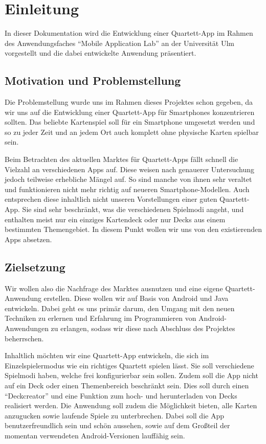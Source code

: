 \chapter{Einleitung}
\label{cha:einleitung}

In dieser Dokumentation wird die Entwicklung einer Quartett-App im Rahmen des Anwendungsfaches ``Mobile Application Lab'' an der Universität Ulm vorgestellt und die dabei entwickelte Anwendung präsentiert.

\section{Motivation und Problemstellung}
\label{sec:einleitung:problemstellung}

Die Problemstellung wurde uns im Rahmen dieses Projektes schon gegeben, da wir uns auf die Entwicklung einer Quartett-App für Smartphones konzentrieren sollten. Das beliebte Kartenspiel soll für ein Smartphone umgesetzt werden und so zu jeder Zeit und an jedem Ort auch komplett ohne physische Karten spielbar sein.

Beim Betrachten des aktuellen Marktes für Quartett-Apps fällt schnell die Vielzahl an verschiedenen Apps auf. Diese weisen nach genauerer Untersuchung jedoch teilweise erhebliche Mängel auf. So sind manche von ihnen sehr veraltet und funktionieren nicht mehr richtig auf neueren Smartphone-Modellen. Auch entsprechen diese inhaltlich nicht unseren Vorstellungen einer guten Quartett-App. Sie sind sehr beschränkt, was die verschiedenen Spielmodi angeht, und enthalten meist nur ein einziges Kartendeck oder nur Decks aus einem bestimmten Themengebiet. In diesem Punkt wollen wir uns von den existierenden Apps absetzen.

\section{Zielsetzung}
\label{sec:einleitung:zielsetzung}

Wir wollen also die Nachfrage des Marktes ausnutzen und eine eigene Quartett-Anwendung erstellen. Diese wollen wir auf Basis von Android und Java entwickeln. Dabei geht es uns primär darum, den Umgang mit den neuen Techniken zu erlernen und Erfahrung im Programmieren von Android-Anwendungen zu erlangen, sodass wir diese nach Abschluss des Projektes beherrschen.

Inhaltlich möchten wir eine Quartett-App entwickeln, die sich im Einzelspielermodus wie ein richtiges Quartett spielen lässt. Sie soll verschiedene Spielmodi haben, welche frei konfigurierbar sein sollen. Zudem soll die App nicht auf ein Deck oder einen Themenbereich beschränkt sein. Dies soll durch einen ``Deckcreator'' und eine Funktion zum hoch- und herunterladen von Decks realisiert werden. Die Anwendung soll zudem die Möglichkeit bieten, alle Karten anzugucken sowie laufende Spiele zu unterbrechen. Dabei soll die App benutzerfreundlich sein und schön aussehen, sowie auf dem Großteil der momentan verwendeten Android-Versionen lauffähig sein.

